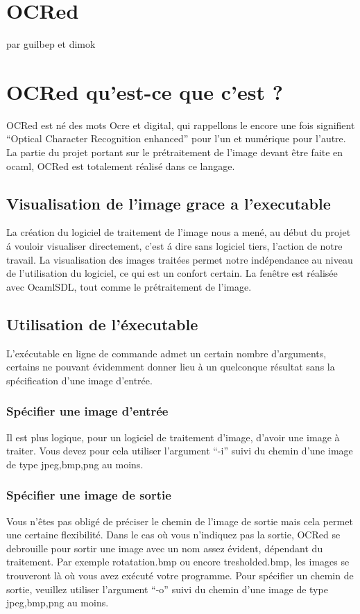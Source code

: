 \chapter{ OCRed }
par guilbep et dimok

\chapter{ OCRed qu'est-ce que c'est ? }
 OCRed est n\'e des mots Ocre et digital, qui rappellons le encore une fois
 signifient ``Optical Character Recognition enhanced'' pour l'un et
 num\'erique pour l'autre. La partie du projet portant sur le
 pr\'etraitement de l'image devant \^etre faite en ocaml, OCRed est
 totalement r\'ealis\'e dans ce langage.

\section{ Visualisation de l'image grace a l'executable }
 La cr\'eation du logiciel de traitement de l'image nous a men\'e, au
 d\'ebut du projet \'a vouloir visualiser directement, c'est \'a dire
 sans logiciel tiers, l'action de notre travail.
 La visualisation des images trait\'ees permet notre ind\'ependance
 au niveau de l'utilisation du logiciel, ce qui est un confort certain.
 La fen\^etre est r\'ealis\'ee avec OcamlSDL, tout comme le pr\'etraitement
 de l'image.

\section{ Utilisation de l'\'executable }
 L'ex\'ecutable en ligne de commande admet un certain nombre d'arguments,
 certains ne pouvant \'evidemment donner lieu \`a un quelconque r\'esultat
 sans la sp\'ecification d'une image d'entr\'ee.
\subsection{ Sp\'ecifier une image d'entr\'ee }
 Il est plus logique, pour un logiciel de traitement d'image, d'avoir
 une image \`a traiter. Vous devez pour cela utiliser l'argument ``-i''
 suivi du chemin d'une image de type jpeg,bmp,png au moins.
\subsection{ Sp\'ecifier une image de sortie }
 Vous n'\^etes pas oblig\'e de pr\'eciser le chemin de l'image de sortie
 mais cela permet une certaine flexibilit\'e. Dans le cas o\`u vous
 n'indiquez pas la sortie, OCRed se debrouille pour sortir une image
 avec un nom assez \'evident, d\'ependant du traitement. Par exemple
 rotatation.bmp ou encore tresholded.bmp, les images se trouveront l\`a
 o\`u vous avez ex\'ecut\'e votre programme. Pour sp\'ecifier un chemin de
 sortie, veuillez utiliser l'argument ``-o'' suivi du chemin d'une image
de type jpeg,bmp,png au moins.

